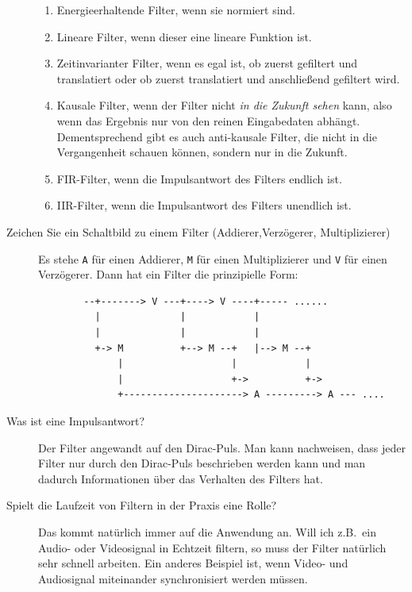 \begin{description}
      \begin{enumerate}
        \item Energieerhaltende Filter, wenn sie normiert sind.
        \item Lineare Filter, wenn dieser eine lineare Funktion ist.
        \item Zeitinvarianter Filter, wenn es egal ist, ob zuerst gefiltert und translatiert
          oder ob zuerst translatiert und anschließend gefiltert wird.
        \item Kausale Filter, wenn der Filter nicht \emph{in die Zukunft sehen} kann, also
          wenn das Ergebnis nur von den reinen Eingabedaten abhängt. Dementsprechend gibt es auch 
          anti-kausale Filter, die nicht in die Vergangenheit schauen können, sondern nur in die 
          Zukunft.
        \item FIR-Filter, wenn die Impulsantwort des Filters endlich ist.
        \item IIR-Filter, wenn die Impulsantwort des Filters unendlich ist.
      \end{enumerate}
	\item[Zeichen Sie ein Schaltbild zu einem Filter (Addierer,Verzögerer, Multiplizierer)]
      Es stehe \lstinline|A| für einen Addierer, \lstinline|M| für einen Multiplizierer und
      \lstinline|V| für einen Verzögerer. Dann hat ein Filter die prinzipielle Form:

      \begin{lstlisting}
        --+-------> V ---+----> V ----+----- ......
          |              |            |
          |              |            |
          +-> M          +--> M --+   |--> M --+
              |                   |            |
              |                   +->          +->
              +---------------------> A ---------> A --- ....
      \end{lstlisting}
	\item[Was ist eine Impulsantwort?]
  	Der Filter angewandt auf den Dirac-Puls. Man kann nachweisen, dass jeder Filter nur durch den 
  	Dirac-Puls beschrieben werden kann und man dadurch Informationen über das Verhalten des Filters 
  	hat.
	\item[Spielt die Laufzeit von Filtern in der Praxis eine Rolle?]
  	Das kommt natürlich immer auf die Anwendung an. Will ich z.B.\ ein Audio- oder Videosignal in 
  	Echtzeit filtern, so muss der Filter natürlich sehr schnell arbeiten. Ein anderes Beispiel ist, 
  	wenn Video- und Audiosignal miteinander synchronisiert werden müssen.
\end{description}
